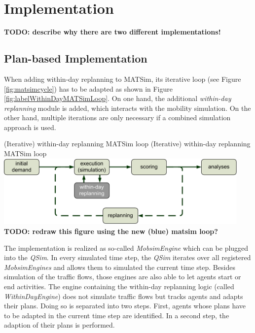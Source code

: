 \section{Implementation}
\textbf{TODO: describe why there are two different implementations!}


\subsection{Plan-based Implementation}

When adding within-day replanning to MATSim, its iterative loop (see Figure \ref{fig:matsimcycle}) has to be adapted as shown in Figure \ref{fig:labelWithinDayMATSimLoop}. On one hand, the additional \emph{within-day replanning} module is added, which interacts with the mobility simulation. On the other hand, multiple iterations are only necessary if a combined simulation approach is used.

\createfigure%
{(Iterative) within-day replanning MATSim loop}%
{(Iterative) within-day replanning MATSim loop}%
{\label{fig:labelWithinDayMATSimLoop}}%
{\includegraphics[width=12.5cm, angle=0]{extending/figures/WithinDayReplanning/WithinDayMATSimLoop}}%
{}%
\textbf{TODO: redraw this figure using the new (blue) matsim loop?}

The implementation is realized as so-called \emph{MobsimEngine} which can be plugged into the \emph{QSim}. In every simulated time step, the \emph{QSim} iterates over all registered \emph{MobsimEngines} and allows them to simulated the current time step. Besides simulation of the traffic flows, those engines are also able to let agents start or end activities. The engine containing the within-day replanning logic (called \emph{WithinDayEngine}) does not simulate traffic flows but tracks agents and adapts their plans. Doing so is separated into two steps. First, agents whose plans have to be adapted in the current time step are identified. In a second step, the adaption of their plans is performed. 

